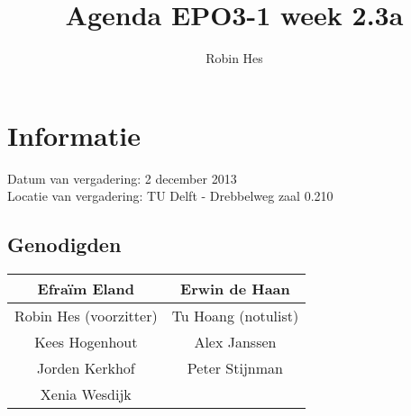 \documentclass{article}
\begin{document}
\title{Agenda EPO3-1 week 2.3a}%
\author{Robin Hes}%
\maketitle

\section*{Informatie}
Datum van vergadering: 2 december 2013\\ %
Locatie van vergadering: TU Delft - Drebbelweg zaal 0.210 %
\subsection*{Genodigden}
\begin{center}
\begin{tabular}{|c |c |}
	\hline
	Efraïm Eland & Erwin de Haan \\
	\hline
	Robin Hes (voorzitter) & Tu Hoang (notulist) \\
	\hline
	Kees Hogenhout & Alex Janssen \\
	\hline
	Jorden Kerkhof & Peter Stijnman \\
	\hline
	Xenia Wesdijk & \\
	\hline
\end{tabular}
\end{center}
\end{document}
